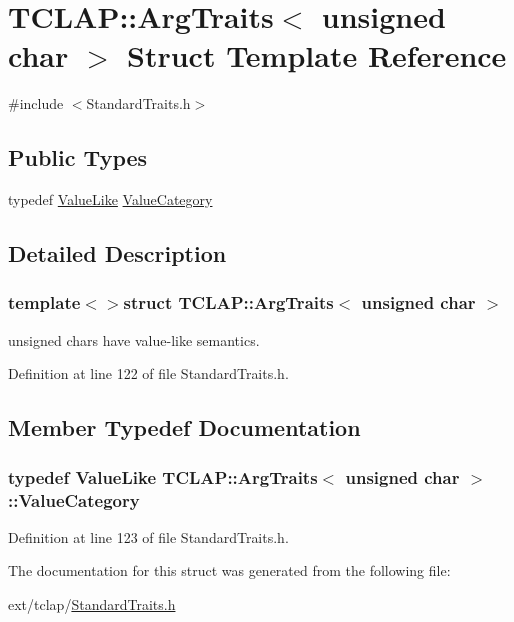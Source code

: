 \hypertarget{struct_t_c_l_a_p_1_1_arg_traits_3_01unsigned_01char_01_4}{}\section{T\+C\+L\+A\+P\+:\+:Arg\+Traits$<$ unsigned char $>$ Struct Template Reference}
\label{struct_t_c_l_a_p_1_1_arg_traits_3_01unsigned_01char_01_4}


{\ttfamily \#include $<$Standard\+Traits.\+h$>$}

\subsection*{Public Types}
\begin{DoxyCompactItemize}
\item 
typedef \hyperlink{struct_t_c_l_a_p_1_1_value_like}{Value\+Like} \hyperlink{struct_t_c_l_a_p_1_1_arg_traits_3_01unsigned_01char_01_4_a3cba1e41ab04d31c7b68b1c5e6e227aa}{Value\+Category}
\end{DoxyCompactItemize}


\subsection{Detailed Description}
\subsubsection*{template$<$$>$struct T\+C\+L\+A\+P\+::\+Arg\+Traits$<$ unsigned char $>$}

unsigned chars have value-\/like semantics. 

Definition at line 122 of file Standard\+Traits.\+h.



\subsection{Member Typedef Documentation}
\hypertarget{struct_t_c_l_a_p_1_1_arg_traits_3_01unsigned_01char_01_4_a3cba1e41ab04d31c7b68b1c5e6e227aa}{}
\subsubsection[{Value\+Category}]{\setlength{\rightskip}{0pt plus 5cm}typedef {\bf Value\+Like} {\bf T\+C\+L\+A\+P\+::\+Arg\+Traits}$<$ unsigned char $>$\+::{\bf Value\+Category}}\label{struct_t_c_l_a_p_1_1_arg_traits_3_01unsigned_01char_01_4_a3cba1e41ab04d31c7b68b1c5e6e227aa}


Definition at line 123 of file Standard\+Traits.\+h.



The documentation for this struct was generated from the following file\+:\begin{DoxyCompactItemize}
\item 
ext/tclap/\hyperlink{_standard_traits_8h}{Standard\+Traits.\+h}\end{DoxyCompactItemize}
